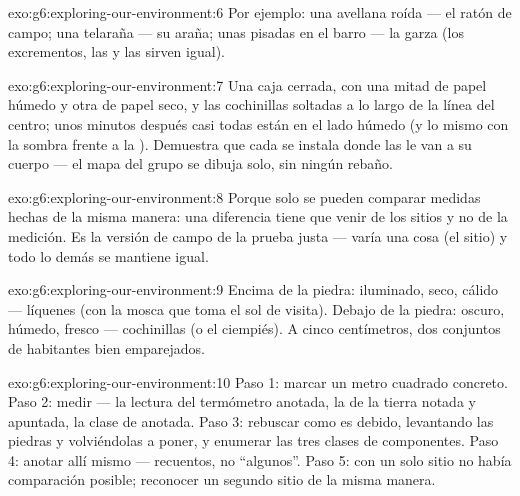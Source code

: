 \begin{solution}{exo:g6:exploring-our-environment:6}
Por ejemplo: una avellana roída --- el ratón de campo; una telaraña
--- su araña; unas pisadas en el barro --- la garza (los excrementos,
las  y las  sirven igual).
\end{solution}

\begin{solution}{exo:g6:exploring-our-environment:7}
Una caja cerrada, con una mitad de papel húmedo y otra de papel seco,
y las cochinillas soltadas a lo largo de la línea del centro; unos
minutos después casi todas están en el lado húmedo (y lo mismo con la
sombra frente a la ). Demuestra que cada  se instala donde
las  le van a su cuerpo --- el mapa del grupo se dibuja
solo, sin ningún rebaño.
\end{solution}

\begin{solution}{exo:g6:exploring-our-environment:8}
Porque solo se pueden comparar medidas hechas de la misma manera: una
diferencia tiene que venir de los sitios y no de la medición. Es la
versión de campo de la prueba justa --- varía una cosa (el sitio) y
todo lo demás se mantiene igual.
\end{solution}

\begin{solution}{exo:g6:exploring-our-environment:9}
Encima de la piedra: iluminado, seco, cálido --- líquenes (con la
mosca que toma el sol de visita). Debajo de la piedra: oscuro, húmedo,
fresco --- cochinillas (o el ciempiés). A cinco centímetros, dos
conjuntos de habitantes bien emparejados.
\end{solution}

\begin{solution}{exo:g6:exploring-our-environment:10}
Paso 1: marcar un metro cuadrado concreto. Paso 2: medir --- la
lectura del termómetro anotada, la  de la tierra notada y
apuntada, la clase de  anotada. Paso 3: rebuscar como es debido,
levantando las piedras y volviéndolas a poner, y enumerar las tres
clases de componentes. Paso 4: anotar allí mismo --- recuentos, no
``algunos''. Paso 5: con un solo sitio no había comparación posible;
reconocer un segundo sitio de la misma manera.
\end{solution}

